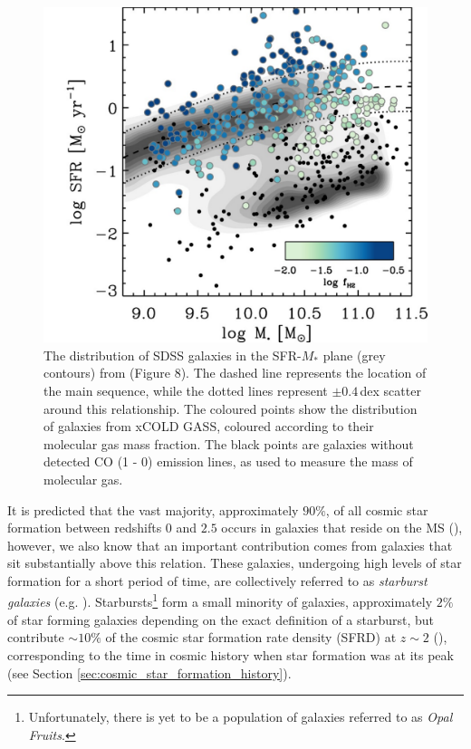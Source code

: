 \begin{figure}
    \centering
	\includegraphics[width=0.7\columnwidth]{Figures/saintonge_ms.pdf}
	\caption[The distribution of SDSS galaxies in the SFR-$M_*$ plane]{The distribution of SDSS galaxies in the SFR-$M_*$ plane (grey contours) from \citealt{Saintonge_2017} (Figure 8). The dashed line represents the location of the main sequence, while the dotted lines represent $\pm0.4\,$dex scatter around this relationship. The coloured points show the distribution of galaxies from xCOLD GASS, coloured according to their molecular gas mass fraction. The black points are galaxies without detected CO (1 - 0) emission lines, as used to measure the mass of molecular gas.}
	\label{fig:star_forming_main_sequence}
\end{figure}

It is predicted that the vast majority, approximately $90\%$, of all cosmic star formation between redshifts $0$ and $2.5$ occurs in galaxies that reside on the MS (\citealt{Rodighiero_2011, Sargent_2012}), however, we also know that an important contribution comes from galaxies that sit substantially above this relation. These galaxies, undergoing high levels of star formation for a short period of time, are collectively referred to as \textit{starburst galaxies} (e.g. \citealt{Muxlow_2006, Rinaldi_2022}). Starbursts\footnote{Unfortunately, there is yet to be a population of galaxies referred to as \textit{Opal Fruits}.} form a small minority of galaxies, approximately $2\%$ of star forming galaxies depending on the exact definition of a starburst, but contribute $\sim 10\%$ of the cosmic star formation rate density (SFRD) at $z \sim 2$ (\citealt{Rodighiero_2011}), corresponding to the time in cosmic history when star formation was at its peak (see Section \ref{sec:cosmic_star_formation_history}).

